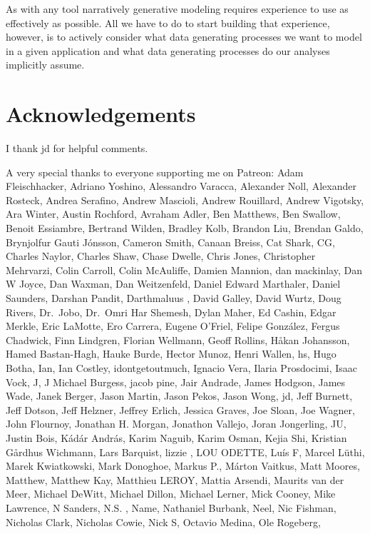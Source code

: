 \documentclass[
  letterpaper,
  DIV=11,
  numbers=noendperiod]{scrartcl}
\begin{document}
As with any tool narratively generative modeling requires experience to
use as effectively as possible. All we have to do to start building that
experience, however, is to actively consider what data generating
processes we want to model in a given application and what data
generating processes do our analyses implicitly assume.

\section*{Acknowledgements}\label{acknowledgements}

I thank jd for helpful comments.

A very special thanks to everyone supporting me on Patreon: Adam
Fleischhacker, Adriano Yoshino, Alessandro Varacca, Alexander Noll,
Alexander Rosteck, Andrea Serafino, Andrew Mascioli, Andrew Rouillard,
Andrew Vigotsky, Ara Winter, Austin Rochford, Avraham Adler, Ben
Matthews, Ben Swallow, Benoit Essiambre, Bertrand Wilden, Bradley Kolb,
Brandon Liu, Brendan Galdo, Brynjolfur Gauti Jónsson, Cameron Smith,
Canaan Breiss, Cat Shark, CG, Charles Naylor, Charles Shaw, Chase
Dwelle, Chris Jones, Christopher Mehrvarzi, Colin Carroll, Colin
McAuliffe, Damien Mannion, dan mackinlay, Dan W Joyce, Dan Waxman, Dan
Weitzenfeld, Daniel Edward Marthaler, Daniel Saunders, Darshan Pandit,
Darthmaluus , David Galley, David Wurtz, Doug Rivers, Dr.~Jobo, Dr.~Omri
Har Shemesh, Dylan Maher, Ed Cashin, Edgar Merkle, Eric LaMotte, Ero
Carrera, Eugene O'Friel, Felipe González, Fergus Chadwick, Finn
Lindgren, Florian Wellmann, Geoff Rollins, Håkan Johansson, Hamed
Bastan-Hagh, Hauke Burde, Hector Munoz, Henri Wallen, hs, Hugo Botha,
Ian, Ian Costley, idontgetoutmuch, Ignacio Vera, Ilaria Prosdocimi,
Isaac Vock, J, J Michael Burgess, jacob pine, Jair Andrade, James
Hodgson, James Wade, Janek Berger, Jason Martin, Jason Pekos, Jason
Wong, jd, Jeff Burnett, Jeff Dotson, Jeff Helzner, Jeffrey Erlich,
Jessica Graves, Joe Sloan, Joe Wagner, John Flournoy, Jonathan H.
Morgan, Jonathon Vallejo, Joran Jongerling, JU, Justin Bois, Kádár
András, Karim Naguib, Karim Osman, Kejia Shi, Kristian Gårdhus Wichmann,
Lars Barquist, lizzie , LOU ODETTE, Luís F, Marcel Lüthi, Marek
Kwiatkowski, Mark Donoghoe, Markus P., Márton Vaitkus, Matt Moores,
Matthew, Matthew Kay, Matthieu LEROY, Mattia Arsendi, Maurits van der
Meer, Michael DeWitt, Michael Dillon, Michael Lerner, Mick Cooney, Mike
Lawrence, N Sanders, N.S. , Name, Nathaniel Burbank, Neel, Nic Fishman,
Nicholas Clark, Nicholas Cowie, Nick S, Octavio Medina, Ole Rogeberg,
\end{document}
